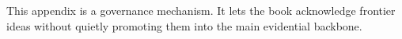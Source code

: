 \begin{summarybox}
This appendix is a governance mechanism. It lets the book acknowledge frontier
ideas without quietly promoting them into the main evidential backbone.
\end{summarybox}
